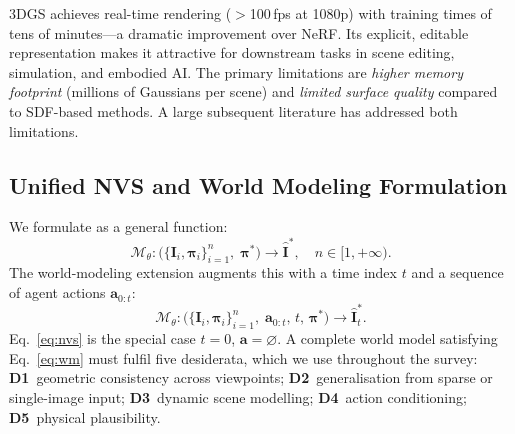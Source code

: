 3DGS achieves real-time rendering ($>$100\,fps at 1080p) with training times
of tens of minutes---a dramatic improvement over NeRF.
Its explicit, editable representation makes it attractive for downstream
tasks in scene editing, simulation, and embodied AI.
The primary limitations are \emph{higher memory footprint} (millions of Gaussians
per scene) and \emph{limited surface quality} compared to SDF-based methods.
A large subsequent literature has addressed both limitations.

\subsection{Unified NVS and World Modeling Formulation}

We formulate \nvs{} as a general function:
\begin{equation}
  \mathcal{M}_\theta:\bigl(\{\mathbf{I}_i,\boldsymbol{\pi}_i\}_{i=1}^n,\;
  \boldsymbol{\pi}^*\bigr)\longrightarrow\hat{\mathbf{I}}^*,
  \quad n\in[1,+\infty).
  \label{eq:nvs}
\end{equation}
The world-modeling extension augments this with a time index $t$ and a
sequence of agent actions $\mathbf{a}_{0:t}$:
\begin{equation}
  \mathcal{M}_\theta:\bigl(\{\mathbf{I}_i,\boldsymbol{\pi}_i\}_{i=1}^n,\;
  \mathbf{a}_{0:t},\,t,\,\boldsymbol{\pi}^*\bigr)\longrightarrow\hat{\mathbf{I}}^*_t.
  \label{eq:wm}
\end{equation}
Eq.~\eqref{eq:nvs} is the special case $t=0$, $\mathbf{a}=\varnothing$.
A complete world model satisfying Eq.~\eqref{eq:wm} must fulfil five desiderata,
which we use throughout the survey:
\textbf{D1}~geometric consistency across viewpoints;
\textbf{D2}~generalisation from sparse or single-image input;
\textbf{D3}~dynamic scene modelling;
\textbf{D4}~action conditioning;
\textbf{D5}~physical plausibility.

